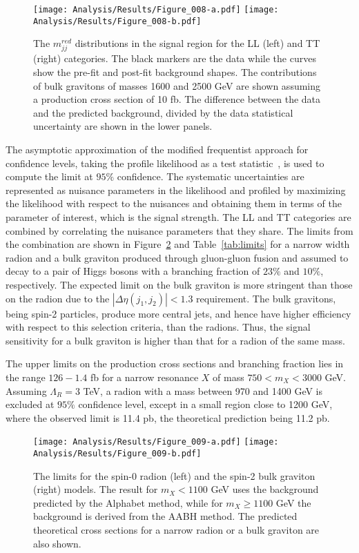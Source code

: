 \begin{figure}[h!]
\centering
\texttt{[image: Analysis/Results/Figure\_008-a.pdf]}
\texttt{[image: Analysis/Results/Figure\_008-b.pdf]}
\caption{The $m_{jj}^{red}$ distributions in the signal region for the LL (left) and TT (right) categories. The black markers are the data while the curves show the pre-fit and post-fit background shapes. The contributions of bulk gravitons of masses 1600 and 2500 GeV are shown assuming a production cross section of 10 fb. The difference between the data and the predicted background, divided by the data statistical uncertainty are shown in the lower panels.}
\label{fig:AABH_SR}
\end{figure}

The asymptotic approximation of the modified frequentist approach for confidence levels, taking the profile likelihood as a test statistic~\cite{CLs,CLs2,CLs3}, is used to compute the limit at $95\%$ confidence. The systematic uncertainties are represented as nuisance parameters in the likelihood and profiled by maximizing the likelihood with respect to the nuisances and obtaining them in terms of the parameter of interest, which is the signal strength. The LL and TT categories are combined by correlating the nuisance parameters that they share. The limits from the combination are shown in Figure~\ref{fig:Limits} and Table~\ref{tab:limits} for a narrow width radion and a bulk graviton produced through gluon-gluon fusion and assumed to decay to a pair of Higgs bosons with a branching fraction of $23\%$ and $10\%$, respectively. The expected limit on the bulk graviton is more stringent than those on the radion due to the $|\Delta\eta(j_{1},j_{2})| < 1.3$ requirement. The bulk gravitons, being spin-2 particles, produce more central jets, and hence have higher efficiency with respect to this selection criteria, than the radions. Thus, the signal sensitivity for a bulk graviton is higher than that for a radion of the same mass.

The upper limits on the production cross sections and branching fraction lies in the range $126-1.4$ fb for a narrow resonance $X$ of mass $750 < m_{X} < 3000$ GeV. Assuming $\Lambda_{R}= 3$ TeV, a radion with a mass between 970 and 1400 GeV is excluded at $95\%$ confidence level, except in a small region close to 1200 GeV, where the observed limit is 11.4 pb, the theoretical prediction being 11.2 pb. 

\begin{figure}[h!]
\centering
\texttt{[image: Analysis/Results/Figure\_009-a.pdf]}
\texttt{[image: Analysis/Results/Figure\_009-b.pdf]}
\caption{The limits for the spin-0 radion (left) and the spin-2 bulk graviton (right) models. The result for $m_{X}<1100$ GeV uses the background predicted by the Alphabet method, while for $m_{X}\ge 1100$ GeV the background is derived from the AABH method. The predicted theoretical cross sections for a narrow radion or a bulk graviton are also shown.}
\label{fig:Limits}
\end{figure}

